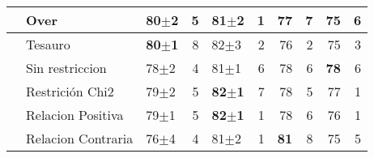 \begin{table}[h]
\begin{center}
{\begin{tabular}{lllrlrrrrr}
                           & \cellcolor[HTML]{EFEFEF}Over            & \cellcolor[HTML]{EFEFEF}\textbf{80$\pm$2} & \cellcolor[HTML]{EFEFEF}5                     & \cellcolor[HTML]{EFEFEF}81$\pm$2          & \cellcolor[HTML]{EFEFEF}1                     & \cellcolor[HTML]{EFEFEF}77          & \cellcolor[HTML]{EFEFEF}7                     & \cellcolor[HTML]{EFEFEF}75          & \cellcolor[HTML]{EFEFEF}6                     \\ \hline
                           & \cellcolor[HTML]{EFEFEF}Tesauro         & \cellcolor[HTML]{EFEFEF}\textbf{80$\pm$1} & \cellcolor[HTML]{EFEFEF}8                     & \cellcolor[HTML]{EFEFEF}82$\pm$3          & \cellcolor[HTML]{EFEFEF}2                     & \cellcolor[HTML]{EFEFEF}76          & \cellcolor[HTML]{EFEFEF}2                     & \cellcolor[HTML]{EFEFEF}75          & \cellcolor[HTML]{EFEFEF}3                     \\ \hline
                           & \cellcolor[HTML]{EFEFEF}Sin restriccion & \cellcolor[HTML]{EFEFEF}78$\pm$2          & \cellcolor[HTML]{EFEFEF}4                     & \cellcolor[HTML]{EFEFEF}81$\pm$1          & \cellcolor[HTML]{EFEFEF}6                     & \cellcolor[HTML]{EFEFEF}78          & \cellcolor[HTML]{EFEFEF}6                     & \cellcolor[HTML]{EFEFEF}\textbf{78} & \cellcolor[HTML]{EFEFEF}6                     \\ \hline
                           & Restrición Chi2                         & 79$\pm$2                                  & 5                                             & \textbf{82$\pm$1}                         & 7                                             & 78                                  & 5                                             & 77                                  & 1                                             \\ \hline
                           & Relacion Positiva                       & 79$\pm$1                                  & 5                                             & \textbf{82$\pm$1}                         & 1                                             & 78                                  & 6                                             & 76                                  & 1                                             \\ \hline
                           & Relacion Contraria                      & 76$\pm$4                                  & 4                                             & 81$\pm$2                                  & 1                                             & \textbf{81}                         & 8                                             & 75                                  & 5                                             \\ \hline
\end{tabular}%

}
\end{center}
\end{table}